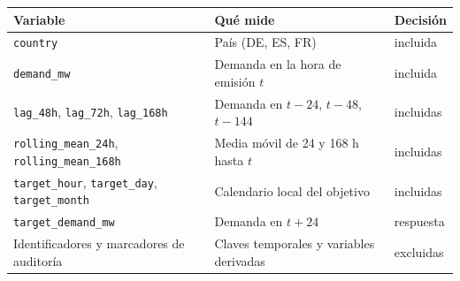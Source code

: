 \begin{tabular}{@{}p{4.4cm}p{6.4cm}p{2.0cm}@{}}
\toprule
Variable & Qué mide & Decisión \\
\midrule
\texttt{country} & País (DE, ES, FR) & incluida \\
\texttt{demand\_mw} & Demanda en la hora de emisión $t$ & incluida \\
\texttt{lag\_48h}, \texttt{lag\_72h}, \texttt{lag\_168h} & Demanda en $t-24$, $t-48$, $t-144$ & incluidas \\
\texttt{rolling\_mean\_24h}, \texttt{rolling\_mean\_168h} & Media móvil de 24 y 168 h hasta $t$ & incluidas \\
\texttt{target\_hour}, \texttt{target\_day}, \texttt{target\_month} & Calendario local del objetivo & incluidas \\
\midrule
\texttt{target\_demand\_mw} & Demanda en $t+24$ & respuesta \\
Identificadores y marcadores de auditoría & Claves temporales y variables derivadas & excluidas \\
\bottomrule
\end{tabular}